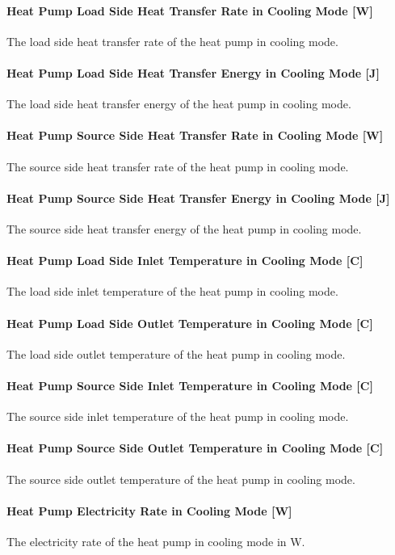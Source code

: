 \paragraph{Heat Pump Load Side Heat Transfer Rate in Cooling Mode {[}W{]}} The
load side heat transfer rate of the heat pump in cooling mode.
\paragraph{Heat Pump Load Side Heat Transfer Energy in Cooling Mode {[}J{]}} The
load side heat transfer energy of the heat pump in cooling mode.
\paragraph{Heat Pump Source Side Heat Transfer Rate in Cooling Mode {[}W{]}} The
source side heat transfer rate of the heat pump in cooling mode.
\paragraph{Heat Pump Source Side Heat Transfer Energy in Cooling Mode {[}J{]}}
The source side heat transfer energy of the heat pump in cooling mode.
\paragraph{Heat Pump Load Side Inlet Temperature in Cooling Mode {[}C{]}} The
load side inlet temperature of the heat pump in cooling mode.
\paragraph{Heat Pump Load Side Outlet Temperature in Cooling Mode {[}C{]}} The
load side outlet temperature of the heat pump in cooling mode.
\paragraph{Heat Pump Source Side Inlet Temperature in Cooling Mode {[}C{]}} The
source side inlet temperature of the heat pump in cooling mode.
\paragraph{Heat Pump Source Side Outlet Temperature in Cooling Mode {[}C{]}} The
source side outlet temperature of the heat pump in cooling mode.
\paragraph{Heat Pump Electricity Rate in Cooling Mode {[}W{]}} The electricity
rate of the heat pump in cooling mode in W.
